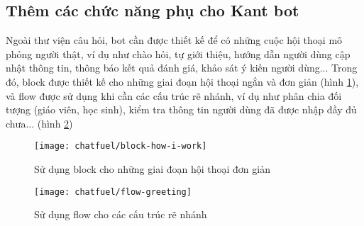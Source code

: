 \subsection{Thêm các chức năng phụ cho Kant bot}
Ngoài thư viện câu hỏi, bot cần được thiết kế để có những cuộc hội thoại mô phỏng người thật, ví dụ như chào hỏi, tự giới thiệu, hướng dẫn người dùng cập nhật thông tin, thông báo kết quả đánh giá, khảo sát ý kiến người dùng... Trong đó, block được thiết kế cho những giai đoạn hội thoại ngắn và đơn giản (hình \ref{fig:fig-c3-block-how-i-work}), và flow được sử dụng khi cần các cấu trúc rẽ nhánh, ví dụ như phân chia đối tượng (giáo viên, học sinh), kiểm tra thông tin người dùng đã được nhập đầy đủ chưa... (hình \ref{fig:fig-c3-flow-greeting})\par
\begin{figure}[htb!]\centering
	\texttt{[image: chatfuel/block-how-i-work]}
	\caption{Sử dụng block cho những giai đoạn hội thoại đơn giản}
	\label{fig:fig-c3-block-how-i-work}
\end{figure}\par

\begin{figure}[htb!]\centering
	\texttt{[image: chatfuel/flow-greeting]}
	\caption{Sử dụng flow cho các cấu trúc rẽ nhánh}
	\label{fig:fig-c3-flow-greeting}
\end{figure}\par
